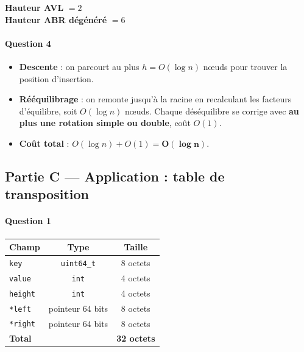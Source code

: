 \documentclass[a4paper,11pt]{article}
\newcommand{\boitereponse}[1]{%
  \begin{mdframed}[linecolor=black!40, backgroundcolor=white, linewidth=0.5pt,
                   innertopmargin=6pt, innerbottommargin=6pt]
  #1
  \end{mdframed}
}
\begin{document}
\boitereponse{%
\textbf{Hauteur AVL} $= 2$\\
\textbf{Hauteur ABR dégénéré} $= 6$
}

\paragraph{Question 4}

\boitereponse{%
\begin{itemize}
  \item \textbf{Descente} : on parcourt au plus $h = O(\log n)$ nœuds pour trouver la position d'insertion.
  \item \textbf{Rééquilibrage} : on remonte jusqu'à la racine en recalculant les facteurs d'équilibre, soit $O(\log n)$ nœuds. Chaque déséquilibre se corrige avec \textbf{au plus une rotation simple ou double}, coût $O(1)$.
  \item \textbf{Coût total} : $O(\log n) + O(1) = \mathbf{O(\log n)}$.
\end{itemize}%
}

\subsection*{Partie C --- Application : table de transposition}

\paragraph{Question 1}

\begin{center}
\begin{tabular}{lcc}
\toprule
Champ         & Type            & Taille \\
\midrule
\texttt{key}   & \texttt{uint64\_t} & 8 octets \\
\texttt{value} & \texttt{int}       & 4 octets \\
\texttt{height}& \texttt{int}       & 4 octets \\
\texttt{*left} & pointeur 64 bits   & 8 octets \\
\texttt{*right}& pointeur 64 bits   & 8 octets \\
\midrule
\textbf{Total} &                    & \textbf{32 octets} \\
\bottomrule
\end{tabular}
\end{center}
\end{document}
